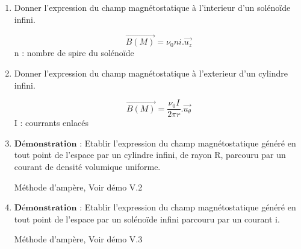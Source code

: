 \begin{enumerate}[label=\arabic{enumi} - , left=0pt, itemsep=1em]
    \item Donner l'expression du champ magnétostatique à l'interieur d'un solénoïde infini.\par
    \begin{solution}
         \[ \vec{B(M)} = \nu_0 n i . \vec{u_z}\] n : nombre de spire du solénoïde
    \end{solution}

    \item Donner l'expression du champ magnétostatique à l'exterieur d'un cylindre infini.\par
    \begin{solution}
         \[ \vec{B(M)} = \frac{\nu_0 I}{2 \pi r} . \vec{u_{\theta}}\] I : courrants enlacés
    \end{solution}

    \item  $\textbf{Démonstration :}$ Etablir l’expression du champ magnétostatique généré en tout point de l’espace par un
    cylindre infini, de rayon R, parcouru par un courant de densité volumique uniforme.\par
    \begin{solution}
         Méthode d'ampère, Voir démo V.2

    \end{solution}


    \item $\textbf{Démonstration :}$ Etablir l’expression du champ magnétostatique généré en tout point de l’espace par un
    solénoïde infini parcouru par un courant i.\par
    \begin{solution}
         Méthode d'ampère, Voir démo V.3

    \end{solution}

\end{enumerate}